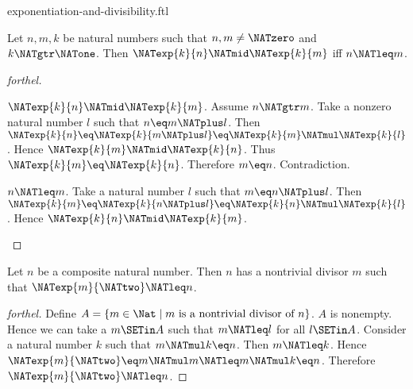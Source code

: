 \documentclass{naproche-library}
\begin{document}
\begin{smodule}[title=Exponentiation and Divisibility]{exponentiation-and-divisibility.ftl}

\begin{proposition}[forthel,id=ARITHMETIC_13_8426075493236736]
  Let $n, m, k$ be natural numbers such that $n, m \neq \NATzero$ and $k \NATgtr \NATone$.
  Then $\NATexp{k}{n} \NATmid \NATexp{k}{m}$ iff $n \NATleq m$.
\end{proposition}
\begin{proof}[forthel]
  \begin{case}{$\NATexp{k}{n} \NATmid \NATexp{k}{m}$.}
    Assume $n \NATgtr m$.
    Take a nonzero natural number $l$ such that $n \eq m \NATplus l$.
    Then $\NATexp{k}{n}
      \eq \NATexp{k}{m \NATplus l}
      \eq \NATexp{k}{m} \NATmul \NATexp{k}{l}$.
    Hence $\NATexp{k}{m} \NATmid \NATexp{k}{n}$.
    Thus $\NATexp{k}{m} \eq \NATexp{k}{n}$.
    Therefore $m \eq n$.
    Contradiction.
  \end{case}

  \begin{case}{$n \NATleq m$.}
    Take a natural number $l$ such that $m \eq n \NATplus l$.
    Then $\NATexp{k}{m}
      \eq \NATexp{k}{n \NATplus l}
      \eq \NATexp{k}{n} \NATmul \NATexp{k}{l}$.
    Hence $\NATexp{k}{n} \NATmid \NATexp{k}{m}$.
  \end{case}
\end{proof}

\begin{proposition}[forthel,id=ARITHMETIC_13_797196163219456]
  Let $n$ be a composite natural number.
  Then $n$ has a nontrivial divisor $m$ such that $\NATexp{m}{\NATtwo} \NATleq n$.
\end{proposition}
\begin{proof}[forthel]
  Define $A = \{ m \in \Nat \mid m\text{ is a nontrivial divisor of }n \}$.
  $A$ is nonempty.
  Hence we can take a $m \SETin A$ such that $m \NATleq l$ for all $l \SETin A$.
  Consider a natural number $k$ such that $m \NATmul k \eq n$.
  Then $m \NATleq k$.
  Hence $\NATexp{m}{\NATtwo} \eq m \NATmul m \NATleq m \NATmul k \eq n$.
  Therefore $\NATexp{m}{\NATtwo} \NATleq n$.
\end{proof}
\end{smodule}
\end{document}

